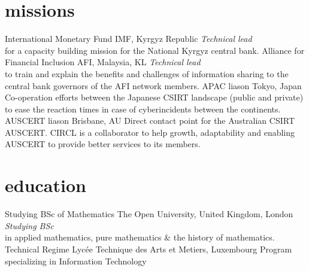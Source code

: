\documentclass[a4paper]{friggeri-cv} %
\begin{document}

\section{missions}
\begin{entrylist}
{International Monetary Fund}
{IMF, Kyrgyz Republic}
{\emph{Technical lead} \\ for a capacity building mission for the National Kyrgyz central bank.}
{Alliance for Financial Inclusion}
{AFI, Malaysia, KL}
{\emph{Technical lead} \\ to train and explain the benefits and challenges of information sharing to the central bank governors of the AFI network members.}
{APAC liason}
{Tokyo, Japan}
{Co-operation efforts between the Japanese CSIRT landscape (public and private) to ease the reaction times in case of cyberincidents between the continents.}
{AUSCERT liason}
{Brisbane, AU}
{Direct contact point for the Australian CSIRT AUSCERT. CIRCL is a collaborator to help growth, adaptability and enabling AUSCERT to provide better services to its members.}
\end{entrylist}

\newpage


\section{education}
\begin{entrylist}
{Studying BSc {\normalfont of Mathematics}}
{The Open University, United Kingdom, London}
{\emph{Studying BSc} \\ in applied mathematics, pure mathematics \& the history of mathematics.}
{Technical Regime}
{Lyc\'{e}e Technique des Arts et Metiers, Luxembourg}
{Program specializing in Information Technology}
\end{entrylist}
\end{document}
